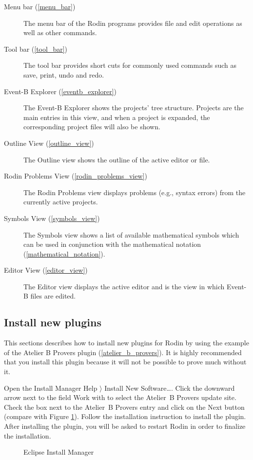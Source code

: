 \begin{description}
	\item[Menu bar (\ref{menu_bar})] The menu bar of the Rodin programs provides file and edit operations as well as other commands.
	\item[Tool bar (\ref{tool_bar})] The tool bar provides short cuts for commonly used commands such as save, print, undo and redo.
	\item[Event-B Explorer (\ref{eventb_explorer})] The Event-B Explorer shows the projects' tree structure. Projects are the main entries in this view, and when a project is expanded, the corresponding project files will also be shown.
	\item[Outline View (\ref{outline_view})] The Outline view shows the outline of the active editor or file.
	\item[Rodin Problems View (\ref{rodin_problems_view})] The Rodin Problems view displays problems (e.g., syntax errors) from the currently active projects.
	\item[Symbols View (\ref{symbols_view})] The Symbols view shows a list of available mathematical symbols which can be used in conjunction with the mathematical notation (\ref{mathematical_notation}).
	\item[Editor View (\ref{editor_view})] The Editor view displays the active editor and is the view in which Event-B files are edited.
\end{description}

\subsection{Install new plugins}
\label{tut_install_plugins}

This sections describes how to install new plugins for Rodin by using the example of the Atelier B Provers plugin (\ref{atelier_b_provers}). It is highly recommended that you install this plugin because it will not be possible to prove much without it.

Open the Install Manager \textsf{Help $\rangle$ Install New Software\ldots}. Click the downward arrow next to the field \textsf{Work with} to select the Atelier~B Provers update site. Check the box next to the Atelier~B Provers entry and click on the \textsf{Next} button (compare with Figure \ref{fig_tut_02_install_manager}). Follow the installation instruction to install the plugin. After installing the plugin, you will be asked to restart Rodin in order to finalize the installation.


\begin{figure}[!ht]
\begin{center}
	\caption{Eclipse Install Manager}
	\label{fig_tut_02_install_manager}
\end{center}
\end{figure}


